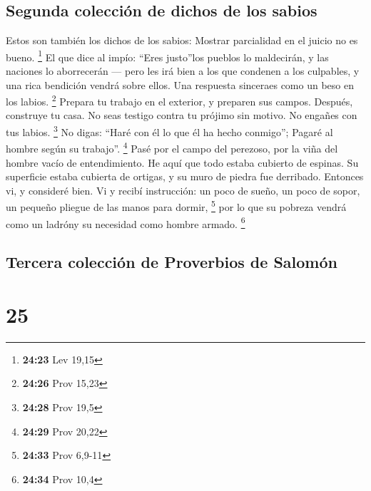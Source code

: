 \hypertarget{segunda-colecciuxf3n-de-dichos-de-los-sabios}{%
\subsection{Segunda colección de dichos de los
sabios}\label{segunda-colecciuxf3n-de-dichos-de-los-sabios}}

 Estos son también los dichos de los sabios: Mostrar
parcialidad en el juicio no es bueno. \footnote{\textbf{24:23} Lev 19,15}
 El que dice al impío: ``Eres justo''los pueblos lo
maldecirán, y las naciones lo aborrecerán ---  pero les
irá bien a los que condenen a los culpables, y una rica bendición vendrá
sobre ellos.  Una respuesta sinceraes como un beso en los
labios. \footnote{\textbf{24:26} Prov 15,23}  Prepara tu
trabajo en el exterior, y preparen sus campos. Después, construye tu
casa.  No seas testigo contra tu prójimo sin motivo. No
engañes con tus labios. \footnote{\textbf{24:28} Prov 19,5}
 No digas: ``Haré con él lo que él ha hecho conmigo'';
Pagaré al hombre según su trabajo''. \footnote{\textbf{24:29} Prov 20,22}
 Pasé por el campo del perezoso, por la viña del hombre
vacío de entendimiento.  He aquí que todo estaba cubierto
de espinas. Su superficie estaba cubierta de ortigas, y su muro de
piedra fue derribado.  Entonces vi, y consideré bien. Vi
y recibí instrucción:  un poco de sueño, un poco de
sopor, un pequeño pliegue de las manos para dormir, \footnote{\textbf{24:33}
  Prov 6,9-11}  por lo que su pobreza vendrá como un
ladróny su necesidad como hombre armado. \footnote{\textbf{24:34} Prov
  10,4}

\hypertarget{tercera-colecciuxf3n-de-proverbios-de-salomuxf3n}{%
\subsection{Tercera colección de Proverbios de
Salomón}\label{tercera-colecciuxf3n-de-proverbios-de-salomuxf3n}}

\hypertarget{section-24}{%
\section{25}\label{section-24}}

